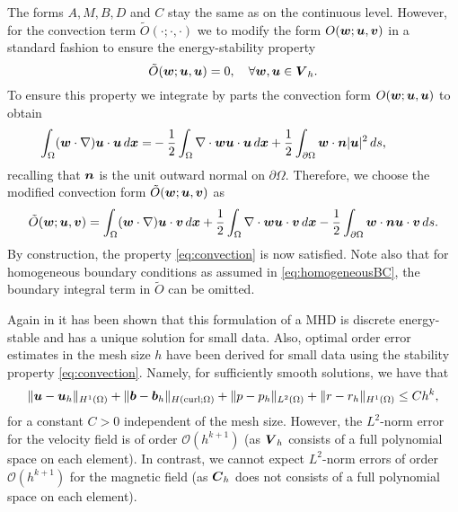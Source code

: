 The forms $A, M, B, D$ and $C$ stay the same as on the continuous level. However, for the convection term $\tilde{O}(\cdot;\cdot,\cdot)$ we to modify the form $O(\boldsymbol w;\boldsymbol u,\boldsymbol v)$ in a standard fashion to ensure the energy-stability property
\begin{equation} \label{eq:convection}
    \tilde{O}(\boldsymbol w;\boldsymbol u,\boldsymbol u) = 0, \quad \forall \boldsymbol w,\boldsymbol u \in  \boldsymbol V_h.
\end{equation}
To ensure this property we integrate by parts the convection form $O(\boldsymbol w;\boldsymbol u,\boldsymbol u)$  to obtain
\begin{equation} \nonumber
 \left. \begin{aligned}
     \int_\Omega (\boldsymbol w\cdot\nabla)\boldsymbol u \cdot\boldsymbol u \, d\boldsymbol x =& -\frac{1}{2}\int_{\Omega} \nabla \cdot \boldsymbol w \boldsymbol u \cdot \boldsymbol u \, d\boldsymbol x
     +\frac{1}{2}\int_{\partial \Omega} \boldsymbol w\cdot \boldsymbol n |\boldsymbol u|^2\, ds,
 \end{aligned}
 \right.
 \qquad \text{}
\end{equation}
recalling that $\boldsymbol n$ is the unit outward normal on $\partial \Omega$. Therefore, we choose the modified convection form $\tilde{O}(\boldsymbol w;\boldsymbol u,\boldsymbol v)$ as
$$\tilde{O}(\boldsymbol w;\boldsymbol u,\boldsymbol v) =  \int_\Omega (\boldsymbol w\cdot\nabla)\boldsymbol u \cdot\boldsymbol v \, d\boldsymbol x +\frac{1}{2}\int_{\Omega} \nabla \cdot \boldsymbol w \boldsymbol u \cdot \boldsymbol v\, d\boldsymbol x-\frac{1}{2}\int_{\partial \Omega} \boldsymbol w\cdot \boldsymbol n \boldsymbol u \cdot \boldsymbol v\, ds.$$
By construction, the property \eqref{eq:convection} is now satisfied. Note also that for homogeneous boundary conditions as assumed in \eqref{eq:homogeneousBC}, the boundary integral term in $\tilde{O}$ can be omitted.

Again in \cite{schotzau2004mixed} it has been shown that this formulation of a MHD is discrete energy-stable and has a unique solution for small data. Also, optimal order error estimates in the mesh size $h$ have been derived for small data using the stability property \eqref{eq:convection}. Namely, for sufficiently smooth solutions, we have that
$$\|\boldsymbol u-\boldsymbol u_h\|_{H^1(\Omega)}+\|\boldsymbol b-\boldsymbol b_h\|_{H(\rm{curl};\Omega)}+\|p-p_h\|_{L^2(\Omega)}+\|r-r_h\|_{H^1(\Omega)} \leq C h^k,$$
for a constant $C>0$ independent of the mesh size. However, the $L^2$-norm error for the velocity field is of order $\mathcal{O}(h^{k+1})$ (as $\boldsymbol V_h$ consists of a full polynomial space on each element). In contrast, we cannot expect $L^2$-norm errors of  order $\mathcal{O}(h^{k+1})$ for the magnetic field (as $\boldsymbol C_h$ does not consists of a full polynomial space on each element).


